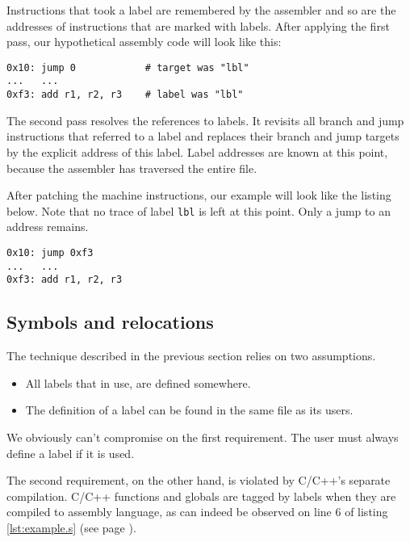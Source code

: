 \documentclass[12pt,a4paper]{article}
\newcommand{\C}{C}
\newcommand{\Cpp}{C++}
\newcommand{\CCpp}{\C/\Cpp}
\newcommand{\labelname}[1]{\texttt{#1}}
\begin{document}
Instructions that took a label are remembered by the assembler and so are the addresses of instructions that are marked with labels. After applying the first pass, our hypothetical assembly code will look like this:\\

\begin{lstlisting}[caption=pseudo-assembly example: after first pass]
0x10: jump 0            # target was "lbl"
...   ...
0xf3: add r1, r2, r3    # label was "lbl"
\end{lstlisting}

The second pass resolves the references to labels. It revisits all branch and jump instructions that referred to a label and replaces their branch and jump targets by the explicit address of this label. Label addresses are known at this point, because the assembler has traversed the entire file. 

After patching the machine instructions, our example will look like the listing below. Note that no trace of label \labelname{lbl} is left at this point. Only a jump to an address remains.\\

\begin{lstlisting}[caption=pseudo-assembly example: after second pass]
0x10: jump 0xf3
...   ...
0xf3: add r1, r2, r3
\end{lstlisting}

\subsection{Symbols and relocations}

The technique described in the previous section relies on two assumptions.

\begin{itemize}
	\item All labels that in use, are defined somewhere.
	\item The definition of a label can be found in the same file as its users.
\end{itemize}

We obviously can't compromise on the first requirement. The user must always define a label if it is used.

The second requirement, on the other hand, is violated by \CCpp{}'s separate compilation. \CCpp{} functions and globals are tagged by labels when they are compiled to assembly language, as can indeed be observed on line 6 of listing \ref{lst:example.s} (see page \pageref{lst:example.s}).
\end{document}

